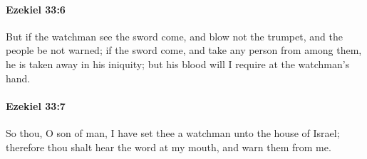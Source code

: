 		\paragraph{Ezekiel 33:6} %
			\label{EZEKIEL-33-6}

			But if the watchman see the sword come, and blow not the trumpet, and the people be not warned; if the sword come, and take any person from among them, he is taken away in his iniquity; but his blood will I require at the watchman’s hand.


		\paragraph{Ezekiel 33:7} %
			\label{EZEKIEL-33-7}

			So thou, O son of man, I have set thee a watchman unto the house of Israel; therefore thou shalt hear the word at my mouth, and warn them from me.

